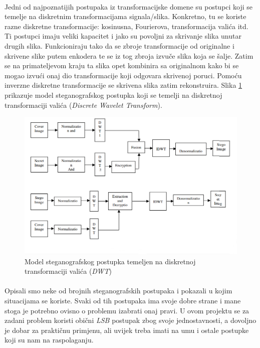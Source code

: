\documentclass[times, utf8, seminar]{fer}
\begin{document}
\paragraph{}
Jedni od najpoznatijih postupaka iz transformacijske domene su postupci koji se temelje na diskretnim transformacijama signala/slika. Konkretno, tu se koriste razne diskretne transformacije: kosinusna, Fourierova, transformacija valića itd. Ti postupci imaju veliki kapacitet i jako su povoljni za skrivanje slika unutar drugih slika. Funkcioniraju tako da se zbroje transformacije od originalne i skrivene slike putem enkodera te se iz tog zbroja izvuče slika koja se šalje. Zatim se na primateljevom kraju ta slika opet kombinira sa originalnom kako bi se mogao izvući onaj dio transformacije koji odgovara skrivenoj poruci. Pomoću inverzne diskretne transformacije se skrivena slika zatim rekonstruira. Slika \ref{dwt} prikazuje model steganografskog postupka koji se temelji na diskretnoj transformaciji valića (\textit{Discrete Wavelet Transform}).
\begin{figure}
\caption{Model steganografskog postupka temeljen na diskretnoj transformaciji valića (\textit{DWT})}
\label{dwt}
\centerline{\includegraphics[scale=0.6]{images/dwt.png}}
\end{figure}
\paragraph{}
Opisali smo neke od brojnih steganografskih postupaka i pokazali u kojim situacijama se koriste. Svaki od tih postupaka ima svoje dobre strane i mane stoga je potrebno ovisno o problemu izabrati onaj pravi. U ovom projektu se za zadani problem koristi obični \textit{LSB} postupak zbog svoje jednostavnosti, a dovoljno je dobar za praktičnu primjenu, ali uvijek treba imati na umu i ostale postupke koji su nam na raspolaganju. 
\end{document}
